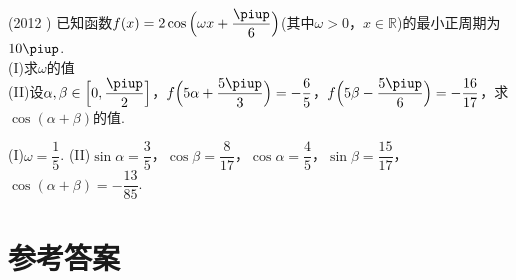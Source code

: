 \begin{exercise}
    \item%
      (2012 )
      已知函数$f(x)=2\cos{\Bigl(\omega x+\dfrac{\piup}6\Bigr)}$(其中$\omega>0$，$x\in\mathbb{R}$)的最小正周期为$10\piup$.\\
      (I)求$\omega$的值\\
      (II)设$\alpha,\beta\in\Bigl[0,\dfrac{\piup}2\Bigr]$，$f{\Bigl(5\alpha+\dfrac{5\piup}3\Bigr)}=-\dfrac{6}5$，$f{\Bigl(5\beta-\dfrac{5\piup}6\Bigr)}=-\dfrac{16}{17}$，求$\cos{(\alpha+\beta)}$的值.
      \begin{answer}
        (I)$\omega=\dfrac{1}5$.
        (II)$\sin\alpha=\dfrac{3}5$，$\cos\beta=\dfrac{8}{17}$，$\cos\alpha=\dfrac{4}5$，$\sin\beta=\dfrac{15}{17}$，$\cos{(\alpha+\beta)}=-\dfrac{13}{85}$.
      \end{answer}
\end{exercise}
\stopexercise

\newpage
\section*{参考答案}
\begin{multicols}{2}
  \printanswer
\end{multicols}
